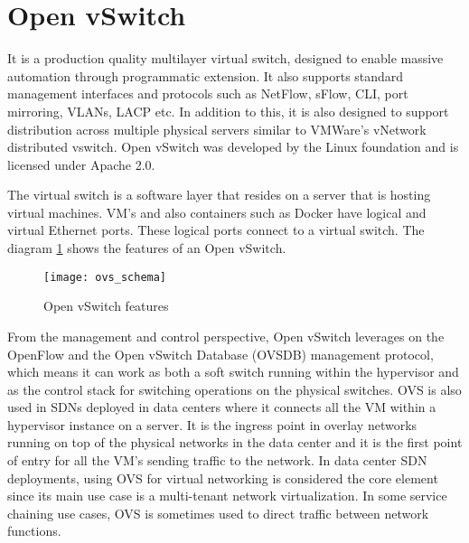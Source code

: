 \section{Open vSwitch \cite{OpenVswitch_design}} \label{OpenvSwitch}
It is a production quality multilayer virtual switch, designed to enable massive automation through programmatic extension. It also supports standard management interfaces and protocols such as NetFlow, sFlow, CLI, port mirroring, VLANs, LACP etc. In addition to this, it is also designed to support distribution across multiple physical servers similar to VMWare’s vNetwork distributed vswitch. Open vSwitch was developed by the Linux foundation and is licensed under Apache 2.0.

The virtual switch is a software layer that resides on a server that is hosting virtual machines. VM’s and also containers such as Docker have logical and virtual Ethernet ports. These logical ports connect to a virtual switch. The diagram \ref{fig:OVS_Features} shows the features of an Open vSwitch. \cite{WhatisOVS}
\begin{figure}
	\centering
	\texttt{[image: ovs\_schema]}
	\caption{Open vSwitch features \cite{ovs_features}} \label{fig:OVS_Features}
	\vspace{-10pt}
\end{figure}

From the management and control perspective, Open vSwitch leverages on the OpenFlow and the Open vSwitch Database (OVSDB) management protocol, which means it can work as both a soft switch running within the hypervisor and as the control stack for switching operations on the physical switches. \gls{OVS} is also used in SDNs deployed in data centers where it connects all the \gls{VM} within a hypervisor instance on a server. It is the ingress point in overlay networks running on top of the physical networks in the data center and it is the first point of entry for all the VM’s sending traffic to the network. In data center SDN deployments, using OVS for virtual networking is considered the core element since its main use case is a multi-tenant network virtualization. In some service chaining use cases, OVS is sometimes used to direct traffic between network functions.

%	


